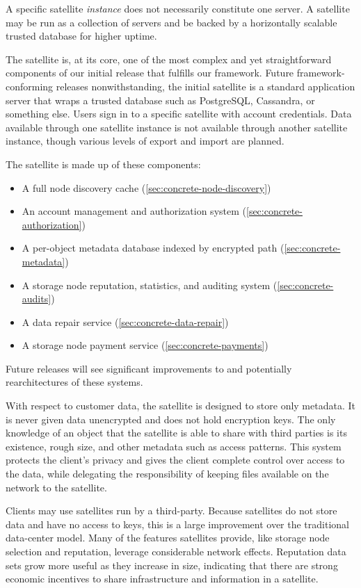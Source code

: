 \documentclass[11pt,fleqn,openany]{book}
\begin{document}
A specific satellite {\em instance} does not necessarily constitute one
server. A satellite may be run as a collection of servers and be backed by
a horizontally scalable trusted database for higher uptime.

The satellite is, at its core, one of the most complex and yet
straightforward components of our initial release that fulfills our framework.
Future framework-conforming releases nonwithstanding, the initial satellite
is a standard application server that wraps a trusted database such as
PostgreSQL, Cassandra, or something else. Users sign in to a specific
satellite with account credentials.
Data available through one satellite instance is
not available through another satellite instance, though various levels of
export and import are planned.

The satellite is made up of these components:
\begin{itemize}
\item A full node discovery cache (\ref{sec:concrete-node-discovery})
\item An account management and authorization system
  (\ref{sec:concrete-authorization})
\item A per-object metadata database indexed by encrypted path
  (\ref{sec:concrete-metadata})
\item A storage node reputation, statistics, and auditing system
  (\ref{sec:concrete-audits})
\item A data repair service (\ref{sec:concrete-data-repair})
\item A storage node payment service (\ref{sec:concrete-payments})
\end{itemize}

Future releases will see significant improvements to and potentially
rearchitectures of these systems.

With respect to customer data, the satellite is designed to store only
metadata. It is never given data unencrypted and does not hold encryption keys.
The only knowledge of an object that the satellite is able to share with
third parties is its existence, rough size, and other metadata such as access
patterns.
This system protects the client's privacy and gives the client complete
control over access to the data,
while delegating the responsibility of keeping files available on the network
to the satellite.

Clients may use satellites run by a third-party. Because satellites do not store
data and have no access to keys, this is a large improvement over the
traditional data-center model. Many of the features satellites provide, like
storage node selection and reputation, leverage considerable network effects.
Reputation data sets grow more useful as they increase in size,
indicating that there are strong economic incentives to share infrastructure
and information in a satellite.
\end{document}
